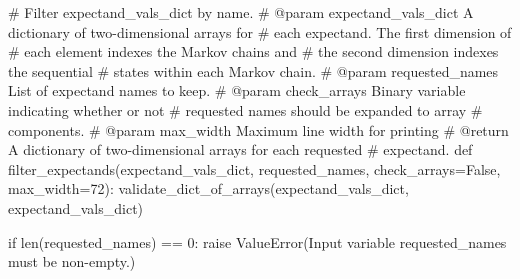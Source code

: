 \documentclass[
  letterpaper,
  DIV=11,
  numbers=noendperiod]{scrartcl}
\newenvironment{Shaded}{\begin{snugshade}}{\end{snugshade}}
\newcommand{\BuiltInTok}[1]{\textcolor[rgb]{0.00,0.23,0.31}{#1}}
\newcommand{\CommentTok}[1]{\textcolor[rgb]{0.37,0.37,0.37}{#1}}
\newcommand{\ControlFlowTok}[1]{\textcolor[rgb]{0.00,0.23,0.31}{#1}}
\newcommand{\DecValTok}[1]{\textcolor[rgb]{0.68,0.00,0.00}{#1}}
\newcommand{\KeywordTok}[1]{\textcolor[rgb]{0.00,0.23,0.31}{#1}}
\newcommand{\NormalTok}[1]{\textcolor[rgb]{0.00,0.23,0.31}{#1}}
\newcommand{\OperatorTok}[1]{\textcolor[rgb]{0.37,0.37,0.37}{#1}}
\newcommand{\PreprocessorTok}[1]{\textcolor[rgb]{0.68,0.00,0.00}{#1}}
\newcommand{\StringTok}[1]{\textcolor[rgb]{0.13,0.47,0.30}{#1}}
\newcommand{\VariableTok}[1]{\textcolor[rgb]{0.07,0.07,0.07}{#1}}
\begin{document}
\begin{Shaded}
\begin{Highlighting}[]
\CommentTok{\# Filter \textasciigrave{}expectand\_vals\_dict\textasciigrave{} by name.}
\CommentTok{\# @param expectand\_vals\_dict A dictionary of two{-}dimensional arrays for}
\CommentTok{\#                            each expectand.  The first dimension of}
\CommentTok{\#                            each element indexes the Markov chains and}
\CommentTok{\#                            the second dimension indexes the sequential}
\CommentTok{\#                            states within each Markov chain.}
\CommentTok{\# @param requested\_names List of expectand names to keep.}
\CommentTok{\# @param check\_arrays Binary variable indicating whether or not}
\CommentTok{\#                     requested names should be expanded to array}
\CommentTok{\#                     components.}
\CommentTok{\# @param max\_width Maximum line width for printing}
\CommentTok{\# @return A dictionary of two{-}dimensional arrays for each requested}
\CommentTok{\#         expectand.}
\KeywordTok{def}\NormalTok{ filter\_expectands(expectand\_vals\_dict, requested\_names,}
\NormalTok{                      check\_arrays}\OperatorTok{=}\VariableTok{False}\NormalTok{, max\_width}\OperatorTok{=}\DecValTok{72}\NormalTok{):}
\NormalTok{  validate\_dict\_of\_arrays(expectand\_vals\_dict, }\StringTok{\textquotesingle{}expectand\_vals\_dict\textquotesingle{}}\NormalTok{)}

  \ControlFlowTok{if} \BuiltInTok{len}\NormalTok{(requested\_names) }\OperatorTok{==} \DecValTok{0}\NormalTok{:}
    \ControlFlowTok{raise} \PreprocessorTok{ValueError}\NormalTok{(}\StringTok{\textquotesingle{}Input variable \textasciigrave{}requested\_names\textasciigrave{} \textquotesingle{}}
                     \StringTok{\textquotesingle{}must be non{-}empty.\textquotesingle{}}\NormalTok{)}


\end{Highlighting}
\end{Shaded}
\end{document}
